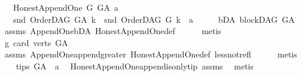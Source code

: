 \begin{isabellebody}
\ \ \ {\isachardoublequoteopen}Honest{\isacharunderscore}{\kern0pt}Append{\isacharunderscore}{\kern0pt}One\ G\ G{\isacharunderscore}{\kern0pt}A\ a{\isachardoublequoteclose}\isanewline
\ \ \ {\isachardoublequoteopen}snd\ {\isacharparenleft}{\kern0pt}OrderDAG\ G{\isacharunderscore}{\kern0pt}A\ k{\isacharparenright}{\kern0pt}\ {\isacharequal}{\kern0pt}\ snd\ {\isacharparenleft}{\kern0pt}OrderDAG\ G\ k{\isacharparenright}{\kern0pt}\ {\isacharat}{\kern0pt}\ {\isacharbrackleft}{\kern0pt}a{\isacharbrackright}{\kern0pt}{\isachardoublequoteclose}\isanewline
%
\isadelimproof
%
\endisadelimproof
%
\isatagproof
{}\isamarkupfalse%
\ {\isacharminus}{\kern0pt}\isanewline
\ \ \isamarkupfalse%
\ bD{\isacharunderscore}{\kern0pt}A{\isacharcolon}{\kern0pt}\ {\isachardoublequoteopen}blockDAG\ G{\isacharunderscore}{\kern0pt}A{\isachardoublequoteclose}\ \isamarkupfalse%
\ assms\ Append{\isacharunderscore}{\kern0pt}One{\isachardot}{\kern0pt}bD{\isacharunderscore}{\kern0pt}A\ Honest{\isacharunderscore}{\kern0pt}Append{\isacharunderscore}{\kern0pt}One{\isacharunderscore}{\kern0pt}def\isanewline
\ \ \ \ \isamarkupfalse%
\ metis\isanewline
\ \ \isamarkupfalse%
\ g{}{\isacharcolon}{\kern0pt}\ {\isachardoublequoteopen}card\ {\isacharparenleft}{\kern0pt}verts\ G{\isacharunderscore}{\kern0pt}A{\isacharparenright}{\kern0pt}\ {\isasymnoteq}\ {}{\isachardoublequoteclose}\ \isanewline
\ \ \ \ \isamarkupfalse%
\ assms\ Append{\isacharunderscore}{\kern0pt}One{\isachardot}{\kern0pt}append{\isacharunderscore}{\kern0pt}greater{\isacharunderscore}{\kern0pt}{}\ Honest{\isacharunderscore}{\kern0pt}Append{\isacharunderscore}{\kern0pt}One{\isacharunderscore}{\kern0pt}def\ less{\isacharunderscore}{\kern0pt}not{\isacharunderscore}{\kern0pt}refl\isanewline
\ \ \ \ \isamarkupfalse%
\ metis\isanewline
\ \ \isamarkupfalse%
\ {\isachardoublequoteopen}{\isacharparenleft}{\kern0pt}tips\ G{\isacharunderscore}{\kern0pt}A{\isacharparenright}{\kern0pt}\ {\isacharequal}{\kern0pt}\ {\isacharbraceleft}{\kern0pt}a{\isacharbraceright}{\kern0pt}{\isachardoublequoteclose}\ \isamarkupfalse%
\ Honest{\isacharunderscore}{\kern0pt}Append{\isacharunderscore}{\kern0pt}One{\isachardot}{\kern0pt}append{\isacharunderscore}{\kern0pt}is{\isacharunderscore}{\kern0pt}only{\isacharunderscore}{\kern0pt}tip\ assms\ \isamarkupfalse%
\ metis\isanewline
\ \ \isamarkupfalse%
\ \isamarkupfalse%

\end{isabellebody}
